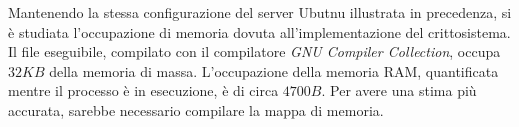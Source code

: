 Mantenendo la stessa configurazione del server Ubutnu illustrata in precedenza, si è studiata l'occupazione di memoria dovuta all'implementazione del crittosistema. Il file eseguibile, compilato con il compilatore \emph{GNU Compiler Collection}, occupa $32KB$ della memoria di massa. L'occupazione della memoria RAM, quantificata mentre il processo è in esecuzione, è di circa $4700B$. Per avere una stima più accurata, sarebbe necessario compilare la mappa di memoria.

























































